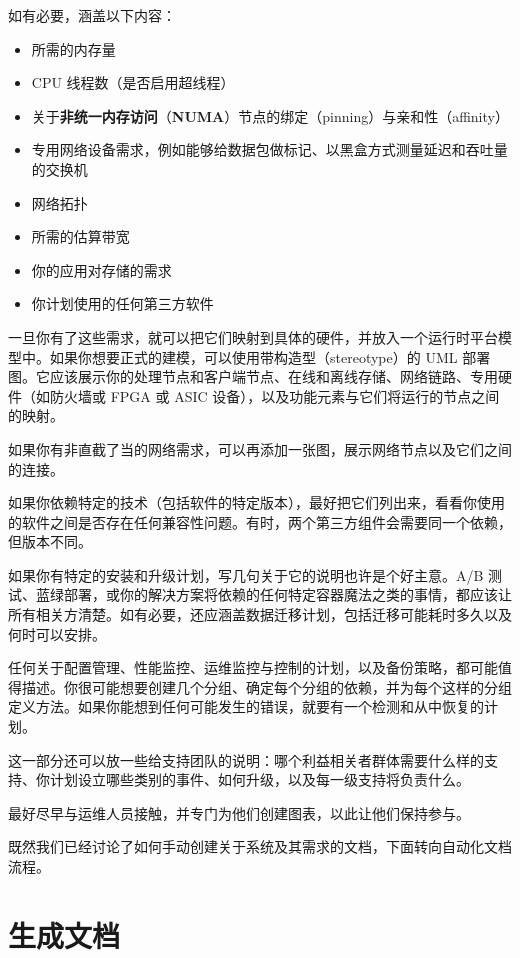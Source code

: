 如有必要，涵盖以下内容：

\begin{itemize}
\item 所需的内存量
\item CPU 线程数（是否启用超线程）
\label{idx:239}
\item 关于\textbf{非统一内存访问}（\textbf{NUMA}）节点的绑定（pinning）与亲和性（affinity）
\item 专用网络设备需求，例如能够给数据包做标记、以黑盒方式测量延迟和吞吐量的交换机
\item 网络拓扑
\item 所需的估算带宽
\item 你的应用对存储的需求
\item 你计划使用的任何第三方软件
\end{itemize}

一旦你有了这些需求，就可以把它们映射到具体的硬件，并放入一个运行时平台模型中。如果你想要正式的建模，可以使用带构造型（stereotype）的 UML 部署图。它应该展示你的处理节点和客户端节点、在线和离线存储、网络链路、专用硬件（如防火墙或 FPGA 或 ASIC 设备），以及功能元素与它们将运行的节点之间的映射。

如果你有非直截了当的网络需求，可以再添加一张图，展示网络节点以及它们之间的连接。

如果你依赖特定的技术（包括软件的特定版本），最好把它们列出来，看看你使用的软件之间是否存在任何兼容性问题。有时，两个第三方组件会需要同一个依赖，但版本不同。

如果你有特定的安装和升级计划，写几句关于它的说明也许是个好主意。A/B 测试、蓝绿部署，或你的解决方案将依赖的任何特定容器魔法之类的事情，都应该让所有相关方清楚。如有必要，还应涵盖数据迁移计划，包括迁移可能耗时多久以及何时可以安排。

任何关于配置管理、性能监控、运维监控与控制的计划，以及备份策略，都可能值得描述。你很可能想要创建几个分组、确定每个分组的依赖，并为每个这样的分组定义方法。如果你能想到任何可能发生的错误，就要有一个检测和从中恢复的计划。

\label{idx:240}
\label{idx:241}
\label{idx:242}
\label{idx:243}
这一部分还可以放一些给支持团队的说明：哪个利益相关者群体需要什么样的支持、你计划设立哪些类别的事件、如何升级，以及每一级支持将负责什么。

最好尽早与运维人员接触，并专门为他们创建图表，以此让他们保持参与。

既然我们已经讨论了如何手动创建关于系统及其需求的文档，下面转向自动化文档流程。

\section{生成文档}

